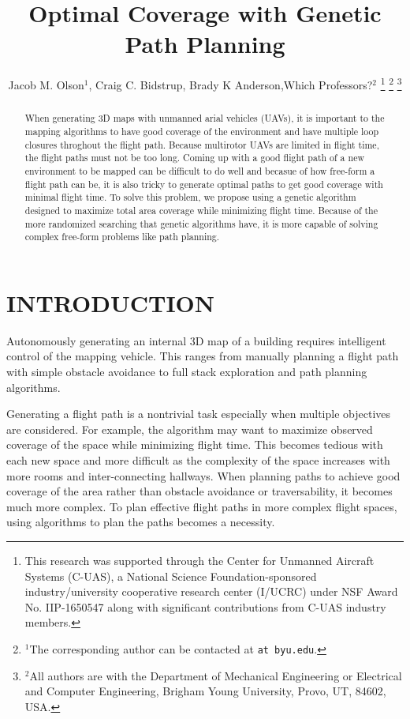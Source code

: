 \documentclass[letterpaper, 10 pt, conference]{ieeeconf}  %
\title{\LARGE \bf
Optimal Coverage with Genetic Path Planning
}
\author{Jacob M. Olson$^{1}$, Craig C. Bidstrup, Brady K Anderson,Which Professors?$^{2}$%
\thanks{This research was supported through the Center for Unmanned Aircraft Systems (C-UAS), a National Science Foundation-sponsored industry/university
cooperative research center (I/UCRC) under NSF Award No. IIP-1650547
along with significant contributions from C-UAS industry members.}%
\thanks{$^{1}$The corresponding author can be contacted at
        {\tt\small  at byu.edu}.}%
\thanks{$^{2}$All authors are with the Department of Mechanical Engineering or Electrical and Computer Engineering,
        Brigham Young University, Provo, UT, 84602, USA.}%
}
\begin{document}
\maketitle
\thispagestyle{empty}
\pagestyle{empty}


\begin{abstract}

When generating 3D maps with unmanned arial vehicles (UAVs), it is important to the mapping algorithms to have good coverage of the environment and have multiple loop closures throghout the flight path. Because multirotor UAVs are limited in flight time, the flight paths must not be too long. Coming up with a good flight path of a new environment to be mapped can be difficult to do well and becasue of how free-form a flight path can be, it is also tricky to generate optimal paths to get good coverage with minimal flight time.
To solve this problem, we propose using a genetic algorithm designed to maximize total area coverage while minimizing flight time. Because of the more randomized searching that genetic algorithms have, it is more capable of solving complex free-form problems like path planning.

\end{abstract}


\section{INTRODUCTION}


Autonomously generating an internal 3D map of a building requires intelligent control of the mapping vehicle. This ranges from manually planning a flight path with simple obstacle avoidance to full stack exploration and path planning algorithms.

Generating a flight path is a nontrivial task especially when multiple objectives are considered. For example, the algorithm may want to maximize observed coverage of the space while minimizing flight time. This becomes tedious with each new space and more difficult as the complexity of the space increases with more rooms and inter-connecting hallways. When planning paths to achieve good coverage of the area rather than obstacle avoidance or traversability, it becomes much more complex. To plan effective flight paths in more complex flight spaces, using algorithms to plan the paths becomes a necessity.
\end{document}
